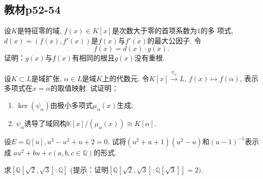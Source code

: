 \subsection{教材p52-54}

\begin{problem}
    设$K$是特征零的域, $f(x) \in K[x]$是次数大于零的首项系数为$1$的多
项式, $d(x) = (f(x), f'(x))$是$f(x)$与$f'(x)$的最大公因子. 令
\[
    f(x) = d(x) \cdot g(x).
\]
证明：$g(x)$与$f(x)$有相同的根且$g(x)$没有重根.
\end{problem}

\begin{solution}
    
\end{solution}

\begin{problem}
    设$K \subset L$是域扩张, $\alpha \in L$是域$K$上的代数元.
令$K[x] \xrightarrow{\psi_{\alpha}}L$,
$f(x) \mapsto f(\alpha)$, 表示多项式在$x = \alpha$的取值映射.
试证明：
\begin{enumerate}[(1)]
    \item $\ker(\psi_\alpha)$由极小多项式$\mu_\alpha(x)$生成;
    \item $\psi_\alpha$诱导了域同构$\mathbb{K}[x]/(\mu_\alpha(x)) \cong K[\alpha]$.
\end{enumerate}
\end{problem}

\begin{solution}
    
\end{solution}

\begin{problem}
    设$E = \mathbb{Q}[u], u^3 - u^2 + u + 2 = 0$.
试将$(u^2 + u + 1)(u^2 - u)$和$(u - 1)^{-1}$表示成
$au^2 + bu + c (a, b, c \in \mathbb{Q})$的形式.
\end{problem}

\begin{solution}
    
\end{solution}

\begin{problem}
    求$[\mathbb{Q}[\sqrt2, \sqrt3]:\mathbb{Q}]$
(提示：证明$\left[\mathbb{Q}[\sqrt2, \sqrt3]:\mathbb{Q}[\sqrt3]\right] = 2)$.
\end{problem}

\begin{solution}
    
\end{solution}

